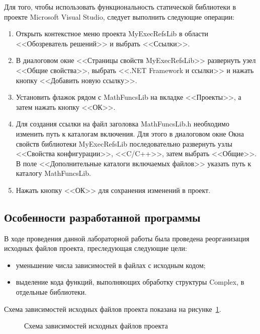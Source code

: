 Для того, чтобы использовать функциональность статической библиотеки в проекте
Microsoft Visual Studio, следует выполнить следующие операции:

\begin{enumerate}
\item
  Открыть контекстное меню проекта MyExecRefsLib в области
  <<Обозреватель решений>> и выбрать <<Ссылки>>.
\item
  В диалоговом окне <<Страницы свойств MyExecRefsLib>> развернуть узел <<Общие свойства>>,
  выбрать <<.NET Framework и ссылки>> и нажать кнопку <<Добавить новую ссылку>>.
\item
  Установить флажок рядом с MathFuncsLib на вкладке <<Проекты>>,
  а затем нажать кнопку <<ОК>>.
\item
  Для создания ссылки на файл заголовка MathFuncsLib.h необходимо изменить путь
  к каталогам включения.
  Для этого в диалоговом окне Окна свойств библиотеки MyExecRefsLib последовательно
  развернуть узлы <<Свойства конфигурации>>, <<C/C++>>, затем выбрать <<Общие>>.
  В поле <<Дополнительные каталоги включаемых файлов>> указать путь к каталогу
  MathFuncsLib.
\item
  Нажать кнопку <<ОК>> для сохранения изменений в проект.
\end{enumerate}

\pagebreak 

\subsection{Особенности разработанной программы}
\label{ssec:program_description}

В ходе проведения данной лабораторной работы была проведена реорганизация 
исходных файлов проекта, преследующая следующие цели:

\begin{itemize}
\item уменьшение числа зависимостей в файлах с исходным кодом;
\item выделение кода функций, выполняющих обработку структуры Complex, 
  в отдельные библиотеки.
\end{itemize}

Схема зависимостей исходных файлов проекта показана на рисунке~\ref{fig:dependencies}.

\begin{figure}[htbp]
  \centering
  \small{
    
  }
  \caption{Схема зависимостей исходных файлов проекта}\label{fig:dependencies}
\end{figure}

